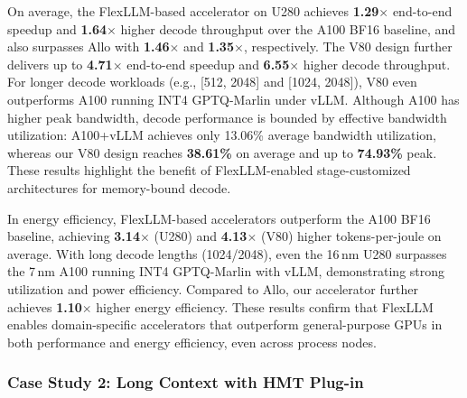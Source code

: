 \documentclass[conference]{IEEEtran}
\begin{document}
On average, the FlexLLM-based accelerator on U280 achieves \textbf{1.29$\times$} end-to-end speedup and \textbf{1.64$\times$} higher decode throughput over the A100 BF16 baseline, and also surpasses Allo with \textbf{1.46$\times$} and \textbf{1.35$\times$}, respectively. The V80 design further delivers up to \textbf{4.71$\times$} end-to-end speedup and \textbf{6.55$\times$} higher decode throughput. For longer decode workloads (e.g., [512, 2048] and [1024, 2048]), V80 even outperforms A100 running INT4 GPTQ-Marlin under vLLM. Although A100 has higher peak bandwidth, decode performance is bounded by effective bandwidth utilization: A100+vLLM achieves only 13.06\% average bandwidth utilization, whereas our V80 design reaches \textbf{38.61\%} on average and up to \textbf{74.93\%} peak. These results highlight the benefit of FlexLLM-enabled stage-customized architectures for memory-bound decode.

In energy efficiency, FlexLLM-based accelerators outperform the A100 BF16 baseline, achieving \textbf{3.14$\times$} (U280) and \textbf{4.13$\times$} (V80) higher tokens-per-joule on average. With long decode lengths (1024/2048), even the 16\,nm U280 surpasses the 7\,nm A100 running INT4 GPTQ-Marlin with vLLM, demonstrating strong utilization and power efficiency. Compared to Allo, our accelerator further achieves \textbf{1.10$\times$} higher energy efficiency. These results confirm that FlexLLM enables domain-specific accelerators that outperform general-purpose GPUs in both performance and energy efficiency, even across process nodes.




\subsubsection{Case Study 2: Long Context with HMT Plug-in}
\label{results for HMT}


\end{document}
